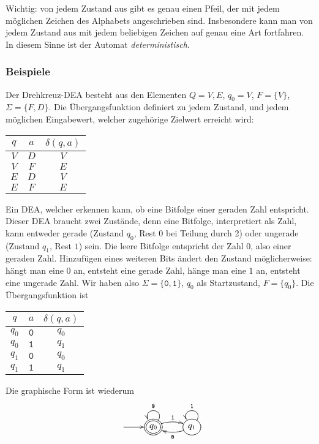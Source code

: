Wichtig: von jedem Zustand aus gibt es genau einen Pfeil, der mit jedem möglichen
Zeichen des Alphabets angeschrieben sind.
Insbesondere kann man von jedem
Zustand aus mit jedem beliebigen Zeichen auf genau eine Art fortfahren.
In diesem Sinne ist der Automat {\em deterministisch}.

\subsubsection{Beispiele}
\begin{beispiel}[\bf Drehkreuz]
Der Drehkreuz-DEA besteht aus den Elementen $Q={V,E}$, $q_0=V$,
$F=\{V\}$, $\Sigma=\{F,D\}$.
Die Übergangsfunktion definiert zu jedem Zustand, und jedem möglichen
Eingabewert, welcher zugehörige Zielwert erreicht wird:
\begin{center}
\begin{tabular}{|cc|c|}
\hline
$q$&$a$&$\delta(q,a)$\\
\hline
$V$&$D$&$V$\\
$V$&$F$&$E$\\
$E$&$D$&$V$\\
$E$&$F$&$E$\\
\hline
\end{tabular}
\end{center}
\end{beispiel}
\begin{beispiel}
Ein DEA, welcher erkennen kann, ob eine Bitfolge einer geraden Zahl entspricht.
Dieser DEA braucht zwei Zustände, denn eine Bitfolge, interpretiert
als Zahl, kann entweder gerade (Zustand $q_0$, Rest $0$ bei Teilung durch 2)
oder ungerade (Zustand $q_1$, Rest $1$) sein.
Die leere Bitfolge entspricht der Zahl $0$, also einer geraden Zahl.
Hinzufügen eines weiteren
Bits ändert den Zustand möglicherweise: hängt man eine $0$ an, entsteht
eine gerade Zahl, hänge man eine $1$ an, entsteht eine ungerade Zahl.
Wir haben also $\Sigma=\{\texttt{0},\texttt{1}\}$, $q_0$ als Startzustand,
$F=\{q_0\}$.
Die Übergangsfunktion ist
\begin{center}
\begin{tabular}{|cc|c|}
\hline
$q$&$a$&$\delta(q,a)$\\
\hline
$q_0$&$\texttt{0}$&$q_0$\\
$q_0$&$\texttt{1}$&$q_1$\\
$q_1$&$\texttt{0}$&$q_0$\\
$q_1$&$\texttt{1}$&$q_1$\\
\hline
\end{tabular}
\end{center}
Die graphische Form ist wiederum
\[
\entrymodifiers={++[o][F]}
\xymatrix{
*+\txt{}\ar[r]
	&*++[o][F=]{q_0} \ar@/^/[r]^{\texttt{1}} \ar@(ur,ul)_{\texttt{0}}
		&{q_1} \ar@/^/[l]^{\texttt{0}} \ar@(ur,ul)_{\texttt{1}}
}
\]
\end{beispiel}
